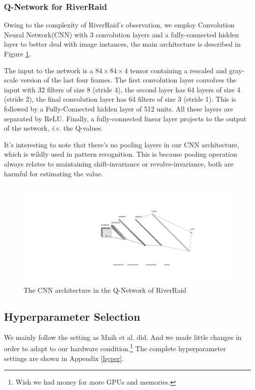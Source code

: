 \documentclass[12pt]{article}
\begin{document}
\subsubsection{Q-Network for RiverRaid}
Owing to the complexity of RiverRaid's observation, we employ Convolution Neural Network(CNN) \cite{fukushima1989hierarchical}\cite{lecun1998gradient} with 3 convolution layers and a fully-connected hidden layer to better deal with image instances, the main architecture is described in Figure \ref{fig:cnn}.

The input to the network is a $84\times84\times4$ tensor containing a rescaled and gray-scale version of the last four frames. The first convolution layer convolves the input with 32 filters of size 8 (stride 4), the second layer has 64 layers of size 4 (stride 2), the final convolution layer has 64 filters of size 3 (stride 1). This is followed by a Fully-Connected hidden layer of 512 units. All these layers are separated by ReLU. Finally, a fully-connected linear layer projects to the output of the network, \emph{i.e.} the Q-values.

It's interesting to note that there's no pooling layers in our CNN architecture, which is wildly used in pattern recognition. This is because pooling operation always relates to maintaining shift-invariance or revolve-invariance, both are harmful for estimating the value.

\begin{figure}[t]
\centering
\includegraphics[scale=0.6]{nn (1).pdf}
\caption{The CNN architecture in the Q-Network of RiverRaid}
\label{fig:cnn}
\end{figure}
\subsection{Hyperparameter Selection}
We mainly follow the setting as Mnih et al. \cite{DBLP:journals/nature/MnihKSRVBGRFOPB15} did. And we made little changes in order to adapt to our hardware condition.\footnote{Wish we had money for more GPUs and memories.} The complete hyperparameter settings are shown in Appendix \ref{hyper}.
\end{document}
